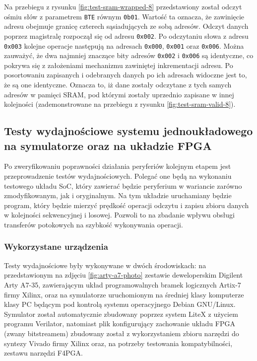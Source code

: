 Na przebiegu z rysunku \ref{fig:test-sram-wrapped-8} przedstawiony został odczyt ośmiu słów z parametrem \texttt{BTE} równym \texttt{0b01}. Wartość ta oznacza, że zawinięcie adresu obejmuje granicę czterech sąsiadujących ze sobą adresów. Odczyt danych poprzez magistralę rozpoczął się od adresu \texttt{0x002}. Po odczytaniu słowa z adresu \texttt{0x003} kolejne operacje następują na adresach \texttt{0x000}, \texttt{0x001} oraz \texttt{0x006}. Można zauważyć, że dwa najmniej znaczące bity adresów \texttt{0x002} i \texttt{0x006} są identyczne, co pokrywa się z założeniami mechanizmu zawiniętej inkrementacji adresu.
Po posortowaniu zapisanych i odebranych danych po ich adresach widoczne jest to, że są one identyczne. Oznacza to, iż dane zostały odczytane z tych samych adresów w pamięci SRAM, pod którymi zostały uprzednio zapisane w innej kolejności (zademonstrowane na przebiegu z rysunku \ref{fig:test-sram-valid-8}).

\subsection{Testy wydajnościowe systemu jednoukładowego na symulatorze oraz na układzie FPGA}

Po zweryfikowaniu poprawności działania peryferiów kolejnym etapem jest przeprowadzenie testów wydajnościowych. Polegać one będą na wykonaniu testowego układu SoC, który zawierać będzie peryferium w wariancie zarówno zmodyfikowanym, jak i oryginalnym. Na tym układzie uruchamiany będzie program, który będzie mierzyć prędkość operacji odczytu i zapisu zbioru danych w kolejności sekwencyjnej i losowej. Pozwoli to na zbadanie wpływu obsługi transferów potokowych na szybkość wykonywania operacji.

\subsubsection{Wykorzystane urządzenia}

Testy wydajnościowe były wykonywane w dwóch środowiskach: na przedstawionym na zdjęciu \ref{fig:arty-a7-photo} zestawie deweloperskim Digilent Arty A7-35\cite{digilent-arty-a7}, zawierającym układ programowalnych bramek logicznych Artix-7 firmy Xilinx, oraz na symulatorze uruchomionym na średniej klasy komputerze klasy PC będącym pod kontrolą systemu operacyjnego Debian GNU/Linux\cite{debian11}. Symulator został automatycznie zbudowany poprzez system LiteX z użyciem programu Verilator, natomiast plik konfigurujący zachowanie układu FPGA (zwany bitstreamem) zbudowany został z wykorzystaniem zbioru narzędzi do syntezy Vivado\cite{vivado2019.1} firmy Xilinx oraz, na potrzeby testowania kompatybilności, zestawu narzędzi F4PGA\cite{f4pga}.

